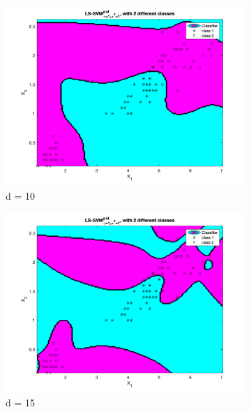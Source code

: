 \documentclass[a4paper, 11pt, one column]{article}
\begin{document}
\begin{figure}[]
        \begin{subfigure}{0.33\linewidth}
            \includegraphics[width=\linewidth]{images/ls_svm_poly_deg10.png}
            \caption{d = 10}
        \end{subfigure}
        \begin{subfigure}{0.33\linewidth}
            \includegraphics[width=\linewidth]{images/ls_svm_poly_deg15.png}
            \caption{d = 15}
        \end{subfigure}
        \begin{subfigure}{0.33\linewidth}

\end{subfigure}
\end{figure}
\end{document}
